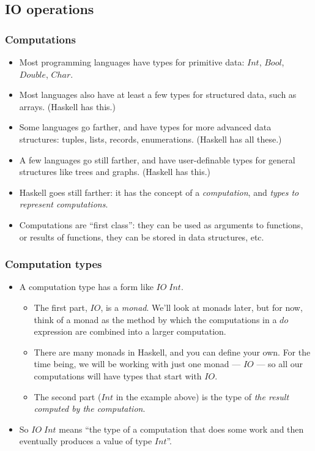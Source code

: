 \documentclass{beamer}
\begin{document}
\subsection{IO operations}

\begin{frame}[fragile]
\frametitle{Computations}

\begin{itemize}
\item Most programming languages have types for primitive data:
  $Int$, $Bool$, $Double$, $Char$.
\item Most languages also have at least a few types for structured
  data, such as arrays.  (Haskell has this.)
\item Some languages go farther, and have types for more advanced
  data structures: tuples, lists, records, enumerations.  (Haskell
  has all these.)
\item A few languages go still farther, and have user-definable
  types for general structures like trees and graphs.  (Haskell has
  this.)
\item Haskell goes still farther: it has the concept of a
  \emph{computation}, and \emph{types to represent computations}.
\item Computations are ``first class'': they can be used as
  arguments to functions, or results of functions, they can be
  stored in data structures, etc.
\end{itemize}

\end{frame}

\begin{frame}[fragile]
\frametitle{Computation types}

\begin{itemize}
\item A computation type has a form like $IO\; Int$.
  \begin{itemize}
  \item The first part, $IO$, is a \emph{monad}.  We'll look at
    monads later, but for now, think of a monad as the method by
    which the computations in a $do$ expression are combined into a
    larger computation.
  \item There are many monads in Haskell, and you can define your
    own.  For the time being, we will be working with just one
    monad --- $IO$ --- so all our computations will have types that
    start with $IO$.
  \item The second part ($Int$ in the example above) is the type of
    \emph{the result computed by the computation}.
  \end{itemize}
\item So $IO\; Int$ means ``the type of a computation that does some
  work and then eventually produces a value of type $Int$''.
\end{itemize}

\end{frame}
\end{document}
